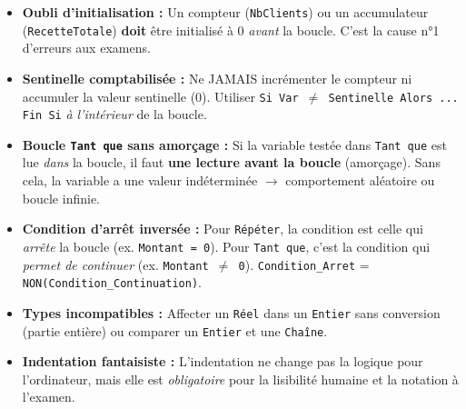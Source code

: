 \documentclass[11pt]{article}
\begin{document}
\begin{attention}
\begin{itemize}
    \item \textbf{Oubli d'initialisation :} Un compteur (\texttt{NbClients}) ou un accumulateur (\texttt{RecetteTotale}) \textbf{doit} être initialisé à 0 \emph{avant} la boucle. C'est la cause n°1 d'erreurs aux examens.
    \item \textbf{Sentinelle comptabilisée :} Ne JAMAIS incrémenter le compteur ni accumuler la valeur sentinelle (0). Utiliser \texttt{Si Var $\neq$ Sentinelle Alors ... Fin Si} \emph{à l'intérieur} de la boucle.
    \item \textbf{Boucle \texttt{Tant que} sans amorçage :} Si la variable testée dans \texttt{Tant que} est lue \emph{dans} la boucle, il faut \textbf{une lecture avant la boucle} (amorçage). Sans cela, la variable a une valeur indéterminée $\rightarrow$ comportement aléatoire ou boucle infinie.
    \item \textbf{Condition d'arrêt inversée :} Pour \texttt{Répéter}, la condition est celle qui \emph{arrête} la boucle (ex. \texttt{Montant = 0}). Pour \texttt{Tant que}, c'est la condition qui \emph{permet de continuer} (ex. \texttt{Montant $\neq$ 0}). \texttt{Condition\_Arret} = \texttt{NON(Condition\_Continuation)}.
    \item \textbf{Types incompatibles :} Affecter un \texttt{Réel} dans un \texttt{Entier} sans conversion (partie entière) ou comparer un \texttt{Entier} et une \texttt{Chaîne}.
    \item \textbf{Indentation fantaisiste :} L'indentation ne change pas la logique pour l'ordinateur, mais elle est \emph{obligatoire} pour la lisibilité humaine et la notation à l'examen.
\end{itemize}
\end{attention}
\end{document}

